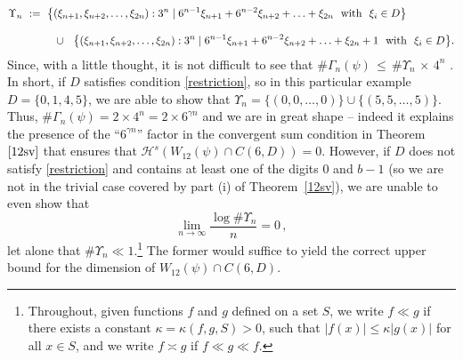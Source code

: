 \documentclass[12pt]{article}
\theoremstyle{definition}
\theoremstyle{remark}
\newcommand{\sv}[1]{{\color{blue}   {#1}}}
\begin{document}
\begin{equation*}
\begin{aligned}
\Upsilon_n  & \ :=   \ \big\{(\xi_{n+1},\xi_{n+2},\ldots,\xi_{2n})  :3^{n}\mid6^{n-1}\xi_{n+1}+6^{n-2}\xi_{n+2}+\ldots+\xi_{2n} \ \  {\rm with \ \  } \xi_{i} \in   D    \big\} \\[2ex]
& ~\hspace{6ex} \cup \ \ \big\{ (\xi_{n+1},\xi_{n+2},\ldots,\xi_{2n}) :3^{n}\mid6^{n-1}\xi_{n+1}+6^{n-2}\xi_{n+2}+\ldots+\xi_{2n}+1 \ \  {\rm with \ \  } \xi_{i} \in   D    \big\}.
\end{aligned}
\end{equation*}
Since, with a little thought, it is not difficult to see that  $\# \Gamma_n (\psi) \,  \leq  \,  \# \Upsilon_n \, \times \, 4^n  $ .
In short, if $D$ satisfies condition \eqref{restriction}, so in this particular example   $D= \{0,1,4,5\}   $, we are able to show that 
$ \Upsilon_n =  \{(0,0,\ldots,0)\}   \cup  \{(5,5,\ldots,5)\}.$ Thus, 
$ \# \Gamma_n (\psi)=  2\times4^n   =      2\times6^{\gamma n}  $
and we are in great  shape -- indeed  it explains the presence of the ``$6^{\gamma n}$'' factor in the convergent sum condition in Theorem $\ref{12sv}$ that ensures that $\mathcal{H}^{s}(W_{12}(\psi)\cap C(6,D))=  0 $.    However, if $D$ does not satisfy \eqref{restriction} and  contains at least one of the digits $0$ and $b-1$ (so we are not in the trivial case covered by part (i) of Theorem~\ref{12sv}),   we are  unable to even show that  
$$\lim_{n\to\infty}\frac{\log\#  \Upsilon_n}{n}=0   \, ,$$
let alone that $\#  \Upsilon_n   \ll 1$.\footnote{{\small %
Throughout, given  functions $f$ and $g$  defined on a set $S$, we
write $f\ll g$ if there exists a constant $\kappa=\kappa(f,g,S)>0$, such that $|f(x)|\leq\kappa |g(x)|$ for all $x\in S$, and we write $f\asymp g$ if $f\ll g\ll f$.}} 
The former would suffice to yield the correct upper bound for the dimension of $W_{12}(\psi)\cap C(6,D)$.    


\bigskip 
\end{document}

